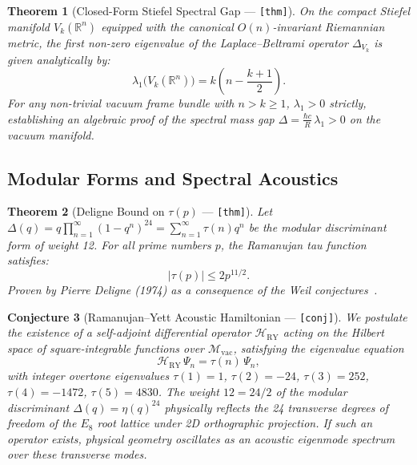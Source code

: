 \documentclass[12pt,letterpaper]{article}
\theoremstyle{plain}
\newtheorem{theorem}{Theorem}[section]
\newtheorem{conjecture}[theorem]{Conjecture}
\theoremstyle{definition}
\begin{document}
\begin{theorem}[Closed-Form Stiefel Spectral Gap --- {\normalfont\texttt{[thm]}}]
\label{thm:stiefel_gap}
On the compact Stiefel manifold $V_k(\mathbb{R}^n)$ equipped with the canonical $O(n)$-invariant Riemannian metric, the first non-zero eigenvalue of the Laplace--Beltrami operator $\Delta_{V_k}$ is given analytically by:
\begin{equation}\label{eq:stiefel_gap}
  \lambda_1\bigl(V_k(\mathbb{R}^n)\bigr) = k\left(n - \frac{k+1}{2}\right).
\end{equation}
For any non-trivial vacuum frame bundle with $n > k \ge 1$, $\lambda_1 > 0$ strictly, establishing an algebraic proof of the spectral mass gap $\Delta = \frac{\hbar c}{R}\,\lambda_1 > 0$ on the vacuum manifold.
\end{theorem}

\subsection{Modular Forms and Spectral Acoustics}

\begin{theorem}[Deligne Bound on $\tau(p)$ --- {\normalfont\texttt{[thm]}}]
\label{thm:deligne}
Let $\Delta(q) = q \prod_{n=1}^\infty (1-q^n)^{24} = \sum_{n=1}^\infty \tau(n) q^n$ be the modular discriminant form of weight 12. For all prime numbers $p$, the Ramanujan tau function satisfies:
\begin{equation}\label{eq:deligne}
  |\tau(p)| \le 2p^{11/2}.
\end{equation}
Proven by Pierre Deligne (1974) as a consequence of the Weil conjectures~\cite{deligne1974}.
\end{theorem}

\begin{conjecture}[Ramanujan--Yett Acoustic Hamiltonian --- {\normalfont\texttt{[conj]}}]
\label{conj:ry_hamiltonian}
We postulate the existence of a self-adjoint differential operator $\mathcal{H}_{\mathrm{RY}}$ acting on the Hilbert space of square-integrable functions over $\mathcal{M}_{\mathrm{vac}}$, satisfying the eigenvalue equation
\begin{equation}\label{eq:ry_spectrum}
  \mathcal{H}_{\mathrm{RY}}\,\Psi_n = \tau(n)\,\Psi_n,
\end{equation}
with integer overtone eigenvalues $\tau(1)=1$, $\tau(2)=-24$, $\tau(3)=252$, $\tau(4)=-1472$, $\tau(5)=4830$. The weight $12 = 24/2$ of the modular discriminant $\Delta(q) = \eta(q)^{24}$ physically reflects the 24 transverse degrees of freedom of the $E_8$ root lattice under 2D orthographic projection. If such an operator exists, physical geometry oscillates as an acoustic eigenmode spectrum over these transverse modes.
\end{conjecture}
\end{document}
